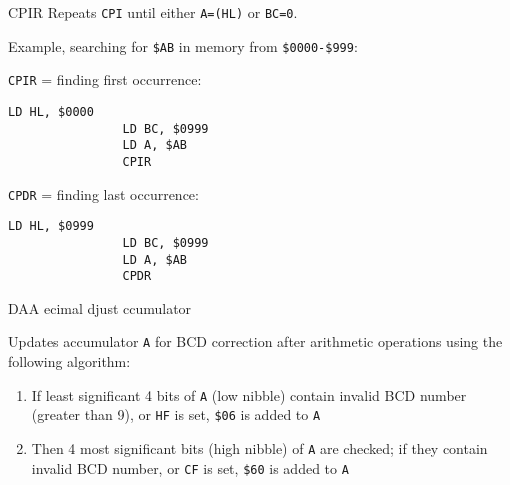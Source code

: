 \documentclass[12pt,twoside,openright,a4paper]{book}
\begin{document}
\begin{basedescript}{
	\desclabelstyle{\multilinelabel}
	\desclabelwidth{3cm}}
\begin{DetailItem}{CPIR}
		Repeats {\tt CPI} until either {\tt A=(HL)} or {\tt BC=0}.

		Example, searching for {\tt \$AB} in memory from {\tt \$0000-\$999}:

		\begin{multicols}{2}
			{\tt CPIR} = finding first occurrence:
			\begin{Verbatim}[gobble=4]
				LD HL, $0000
				LD BC, $0999
				LD A, $AB
				CPIR
			\end{Verbatim}

			{\tt CPDR} = finding last occurrence:
			\begin{Verbatim}[gobble=4]
				LD HL, $0999
				LD BC, $0999
				LD A, $AB
				CPDR
			\end{Verbatim}
		\end{multicols}

		\begin{DetailEffects}
		\end{DetailEffects}
				
		\begin{DetailTiming}
		\end{DetailTiming}

	\end{DetailItem}


	\begin{DetailItem}{DAA}
		{ecimal djust ccumulator}
		{}

		Updates accumulator {\tt A} for BCD correction after arithmetic operations using the following algorithm:

		\begin{enumerate}
			\item If least significant 4 bits of {\tt A} (low nibble) contain invalid BCD number (greater than 9), or {\tt HF} is set, {\tt \$06} is added to {\tt A}
			\item Then 4 most significant bits (high nibble) of {\tt A} are checked; if they contain invalid BCD number, or {\tt CF} is set, {\tt \$60} is added to {\tt A}
		\end{enumerate}
		

\end{DetailItem}
\end{basedescript}
\end{document}
